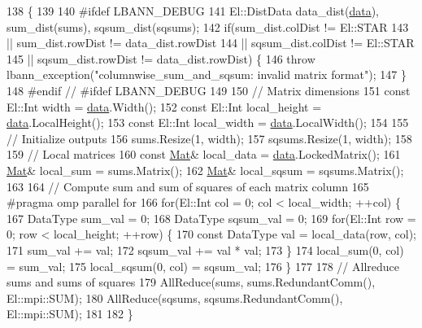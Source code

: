 \begin{DoxyCode}
138                                                    \{
139 
140 \textcolor{preprocessor}{#ifdef LBANN\_DEBUG}
141   El::DistData data\_dist(\hyperlink{namespacelbann_1_1cnpy__utils_a9ac86d96ccb1f8b4b2ea16441738781f}{data}), sum\_dist(sums), sqsum\_dist(sqsums);
142   \textcolor{keywordflow}{if}(sum\_dist.colDist != El::STAR
143       || sum\_dist.rowDist != data\_dist.rowDist
144       || sqsum\_dist.colDist != El::STAR
145       || sqsum\_dist.rowDist != data\_dist.rowDist) \{
146     \textcolor{keywordflow}{throw} lbann\_exception(\textcolor{stringliteral}{"columnwise\_sum\_and\_sqsum: invalid matrix format"});
147   \}
148 \textcolor{preprocessor}{#endif // #ifdef LBANN\_DEBUG}
149 
150   \textcolor{comment}{// Matrix dimensions}
151   \textcolor{keyword}{const} El::Int width = \hyperlink{namespacelbann_1_1cnpy__utils_a9ac86d96ccb1f8b4b2ea16441738781f}{data}.Width();
152   \textcolor{keyword}{const} El::Int local\_height = \hyperlink{namespacelbann_1_1cnpy__utils_a9ac86d96ccb1f8b4b2ea16441738781f}{data}.LocalHeight();
153   \textcolor{keyword}{const} El::Int local\_width = \hyperlink{namespacelbann_1_1cnpy__utils_a9ac86d96ccb1f8b4b2ea16441738781f}{data}.LocalWidth();
154 
155   \textcolor{comment}{// Initialize outputs}
156   sums.Resize(1, width);
157   sqsums.Resize(1, width);
158 
159   \textcolor{comment}{// Local matrices}
160   \textcolor{keyword}{const} \hyperlink{base_8hpp_a68f11fdc31b62516cb310831bbe54d73}{Mat}& local\_data = \hyperlink{namespacelbann_1_1cnpy__utils_a9ac86d96ccb1f8b4b2ea16441738781f}{data}.LockedMatrix();
161   \hyperlink{base_8hpp_a68f11fdc31b62516cb310831bbe54d73}{Mat}& local\_sum = sums.Matrix();
162   \hyperlink{base_8hpp_a68f11fdc31b62516cb310831bbe54d73}{Mat}& local\_sqsum = sqsums.Matrix();
163 
164   \textcolor{comment}{// Compute sum and sum of squares of each matrix column}
165 \textcolor{preprocessor}{  #pragma omp parallel for}
166   \textcolor{keywordflow}{for}(El::Int col = 0; col < local\_width; ++col) \{
167     DataType sum\_val = 0;
168     DataType sqsum\_val = 0;
169     \textcolor{keywordflow}{for}(El::Int row = 0; row < local\_height; ++row) \{
170       \textcolor{keyword}{const} DataType val = local\_data(row, col);
171       sum\_val += val;
172       sqsum\_val += val * val;
173     \}
174     local\_sum(0, col) = sum\_val;
175     local\_sqsum(0, col) = sqsum\_val;
176   \}
177 
178   \textcolor{comment}{// Allreduce sums and sums of squares}
179   AllReduce(sums, sums.RedundantComm(), El::mpi::SUM);
180   AllReduce(sqsums, sqsums.RedundantComm(), El::mpi::SUM);
181 
182 \}
\end{DoxyCode}
